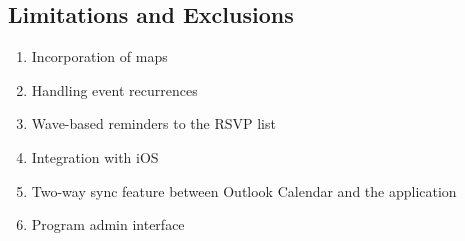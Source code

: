 \subsection{Limitations and Exclusions}

\begin{enumerate}
    \item Incorporation of maps
    \item Handling event recurrences
    \item Wave-based reminders to the RSVP list
    \item Integration with iOS
    \item Two-way sync feature between Outlook Calendar and the application
    \item Program admin interface
\end{enumerate}
